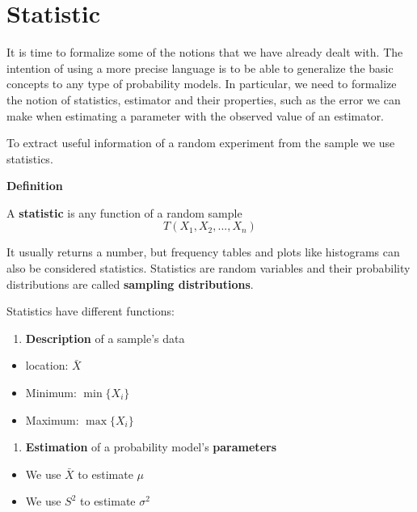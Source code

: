 \documentclass[
]{book}
\providecommand{\tightlist}{%
  \setlength{\itemsep}{0pt}\setlength{\parskip}{0pt}}
\begin{document}
\hypertarget{statistic}{%
\section{Statistic}\label{statistic}}

It is time to formalize some of the notions that we have already dealt with. The intention of using a more precise language is to be able to generalize the basic concepts to any type of probability models. In particular, we need to formalize the notion of statistics, estimator and their properties, such as the error we can make when estimating a parameter with the observed value of an estimator.

To extract useful information of a random experiment from the sample we use statistics.

\textbf{Definition}

A \textbf{statistic} is any function of a random sample
\[T(X_1,X_2, ..., X_n)\]

It usually returns a number, but frequency tables and plots like histograms can also be considered statistics. Statistics are random variables and their probability distributions are called \textbf{sampling distributions}.

Statistics have different functions:

\begin{enumerate}
\def\labelenumi{\arabic{enumi}.}
\tightlist
\item
  \textbf{Description} of a sample's data
\end{enumerate}

\begin{itemize}
\tightlist
\item
  location: \(\bar{X}\)
\item
  Minimum: \(\min\{X_i\}\)
\item
  Maximum: \(\max\{X_i\}\)
\end{itemize}

\begin{enumerate}
\def\labelenumi{\arabic{enumi}.}
\setcounter{enumi}{1}
\tightlist
\item
  \textbf{Estimation} of a probability model's \textbf{parameters}
\end{enumerate}

\begin{itemize}
\tightlist
\item
  We use \(\bar{X}\) to estimate \(\mu\)
\item
  We use \(S^2\) to estimate \(\sigma^2\)
\end{itemize}
\end{document}
